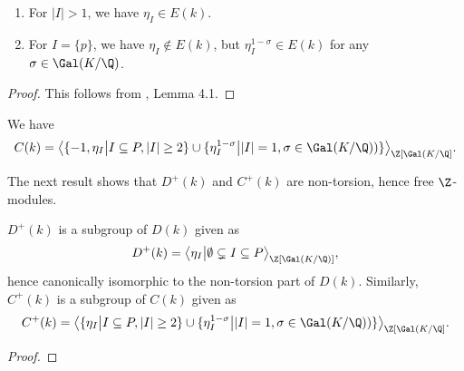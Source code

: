 \begin{lemma}\leavevmode
\begin{enumerate}%
\item For $|I|>1$, we have $\eta_I\in E(k)$.
\item For $I=\{p\}$, we have $\eta_I\not\in E(k)$, but $\eta_I^{1-\sigma}\in E(k)$ for any $\sigma\in \Gal(K/\Q)$. %
\end{enumerate}
\end{lemma}
\begin{proof}
This follows from \citep{SinnottAb}, Lemma 4.1. %
\end{proof}

\begin{cor}
We have $$C(k)=\big\langle \{ -1, \eta_I \big\vert I \subseteq P,  |I|\geq 2\} \cup \{\eta_I^{1-\sigma} \big\vert |I|=1, \sigma\in \Gal(K/\Q))\}\big\rangle_{\Z[\Gal(K/\Q]}.$$
\end{cor}

The next result shows that $D^+(k)$ and $C^+(k)$ are non-torsion, hence free $\Z$-modules.
\begin{lemma}\label{torsion}
$D^+(k)$ is a subgroup of $D(k)$ given as $$D^+(k)=\big\langle  \eta_I \big\vert \emptyset \subsetneq I \subseteq P\big\rangle_{\Z[\Gal(K/\Q)]},$$
hence canonically isomorphic to the non-torsion part of $D(k)$. Similarly, $C^+(k)$ is a subgroup of $C(k)$ given as $$C^+(k)=\big\langle \{ \eta_I \big\vert I \subseteq P,  |I|\geq 2\} \cup \{\eta_I^{1-\sigma} \big\vert |I|=1, \sigma\in \Gal(K/\Q))\}\big\rangle_{\Z[\Gal(K/\Q]}.$$
\end{lemma}
\begin{proof}
\end{proof}

